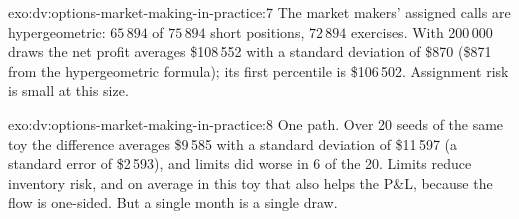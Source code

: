 \begin{solution}{exo:dv:options-market-making-in-practice:7}
The market makers' assigned calls are hypergeometric: $65\,894$ of $75\,894$ short positions, $72\,894$ exercises. With 200\,000 draws the net profit averages
\$108\,552 with a standard deviation of \$870 (\$871 from the hypergeometric formula); its first percentile is \$106\,502. Assignment risk is small at this size.
\end{solution}

\begin{solution}{exo:dv:options-market-making-in-practice:8}
One path. Over 20 seeds of the same toy the difference averages \$9\,585 with a standard deviation of \$11\,597 (a standard error of \$2\,593), and limits did worse
in 6 of the 20. Limits reduce inventory risk, and on average in this toy that also helps the P\&L, because the flow is one-sided. But a single month is a
single draw.
\end{solution}

